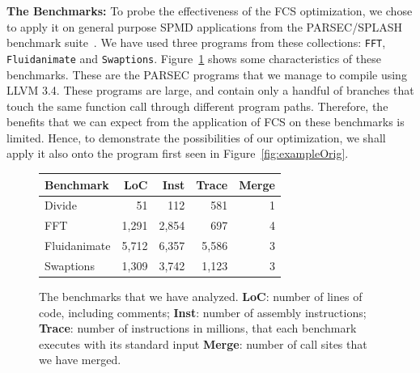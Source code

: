 \documentclass[times,10pt,twocolumn]{article}
\begin{document}
\noindent
\textbf{The Benchmarks:}
To probe the effectiveness of the FCS optimization,
we chose to apply it on general purpose SPMD applications from the PARSEC/SPLASH
benchmark suite~\cite{Bienia08}.
We have used three programs from these collections: \texttt{FFT},
\texttt{Fluidanimate} and \texttt{Swaptions}.
Figure~\ref{fig:benchmarks} shows some characteristics of these benchmarks.
These are the PARSEC programs that we manage to compile using LLVM 3.4.
These programs are large, and contain only a handful of branches that
touch the same function call through different program paths.
Therefore, the benefits that we can expect from the application of FCS on these
benchmarks is limited.
Hence, to demonstrate the possibilities of our optimization, we shall apply it
also onto the program first seen in Figure~\ref{fig:exampleOrig}.

\begin{figure}[t!]
\begin{small}
\renewcommand\arraystretch{1.2}
\begin{center}
\begin{tabular}{l|rrrr}
\textbf{Benchmark} & \textbf{LoC} & \textbf{Inst} & \textbf{Trace} &
\textbf{Merge} \\ \hline
Divide       &    51 &   112 &   581 & 1 \\
FFT          & 1,291 & 2,854 &   697 & 4 \\
Fluidanimate & 5,712 & 6,357 & 5,586 & 3 \\
Swaptions    & 1,309 & 3,742 & 1,123 & 3
\end{tabular}
\end{center}
\caption{The benchmarks that we have analyzed.
\textbf{LoC}: number of lines of code, including comments;
\textbf{Inst}: number of assembly instructions;
\textbf{Trace}: number of instructions in millions, that each benchmark
executes with its standard input
\textbf{Merge}: number of call sites that we have merged.}
\label{fig:benchmarks}
\end{small}
\end{figure}

\end{document}
